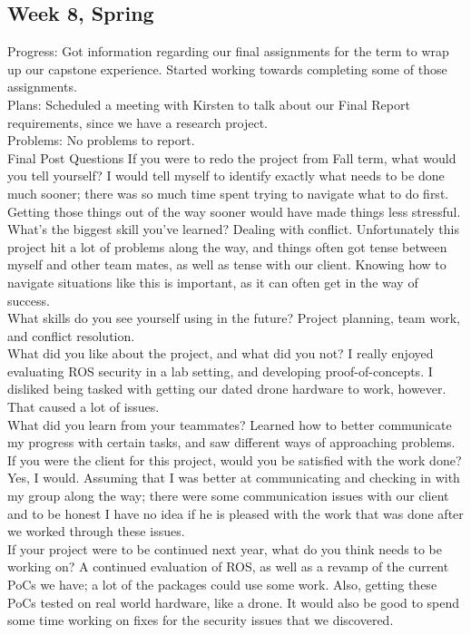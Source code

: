 \documentclass[IEEEtran,letterpaper,10pt,notitlepage,draftclsnofoot,onecolumn]{article}
\begin{document}
\begin{sloppypar}
\subsection{Week 8, Spring}
Progress: Got information regarding our final assignments for the term to wrap up our capstone experience. Started working towards completing some of those assignments.\\
Plans: Scheduled a meeting with Kirsten to talk about our Final Report requirements, since we have a research project.\\
Problems: No problems to report.\\
Final Post Questions
If you were to redo the project from Fall term, what would you tell yourself? I would tell myself to identify exactly what needs to be done much sooner; there was so much time spent trying to navigate what to do first. Getting those things out of the way sooner would have made things less stressful. \\
What's the biggest skill you've learned? Dealing with conflict. Unfortunately this project hit a lot of problems along the way, and things often got tense between myself and other team mates, as well as tense with our client. Knowing how to navigate situations like this is important, as it can often get in the way of success. \\
What skills do you see yourself using in the future? Project planning, team work, and conflict resolution. \\
What did you like about the project, and what did you not? I really enjoyed evaluating ROS security in a lab setting, and developing proof-of-concepts. I disliked being tasked with getting our dated drone hardware to work, however. That caused a lot of issues. \\
What did you learn from your teammates? Learned how to better communicate my progress with certain tasks, and saw different ways of approaching problems.\\
If you were the client for this project, would you be satisfied with the work done? Yes, I would. Assuming that I was better at communicating and checking in with my group along the way; there were some communication issues with our client and to be honest I have no idea if he is pleased with the work that was done after we worked through these issues. \\
If your project were to be continued next year, what do you think needs to be working on? A continued evaluation of ROS, as well as a revamp of the current PoCs we have; a lot of the packages could use some work. Also, getting these PoCs tested on real world hardware, like a drone. It would also be good to spend some time working on fixes for the security issues that we discovered. \\
\end{sloppypar}
\end{document}
